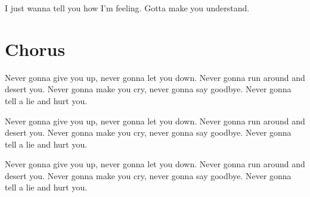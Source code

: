 \documentclass{article}
\begin{document}
I just wanna tell you how I'm feeling.
Gotta make you understand.

\section{Chorus}

Never gonna give you up, never gonna let you down.
Never gonna run around and desert you.
Never gonna make you cry, never gonna say goodbye.
Never gonna tell a lie and hurt you.

Never gonna give you up, never gonna let you down.
Never gonna run around and desert you.
Never gonna make you cry, never gonna say goodbye.
Never gonna tell a lie and hurt you.

Never gonna give you up, never gonna let you down.
Never gonna run around and desert you.
Never gonna make you cry, never gonna say goodbye.
Never gonna tell a lie and hurt you.

\printbibliography
\end{document}
